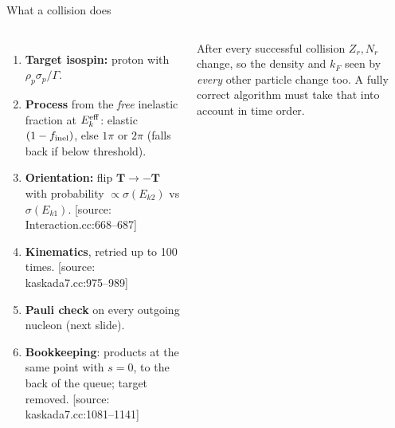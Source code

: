 \documentclass[10pt,aspectratio=169]{beamer}
\newcommand{\G}{\Gamma}
\newcommand{\Ekeff}{E_k^{\rm eff}}
\newcommand{\tagsrc}[1]{{\scriptsize\color{aBlue}[source: #1]}}
\begin{document}
\begin{frame}{What a collision does}
\small
\begin{columns}[T]
\begin{enumerate}
\item \textbf{Target isospin:} proton with $\rho_p\sigma_p/\G$.
\item \textbf{Process} from the \emph{free} inelastic fraction at $\Ekeff$: elastic $(1-f_{\rm inel})$, else $1\pi$ or $2\pi$ (falls back if below threshold).
\item \textbf{Orientation:} flip $\mathbf T\to-\mathbf T$ with probability $\propto\sigma(E_{k2})$ vs $\sigma(E_{k1})$. \tagsrc{Interaction.cc:668--687}
\item \textbf{Kinematics}, retried up to 100 times. \tagsrc{kaskada7.cc:975--989}
\item \textbf{Pauli check} on every outgoing nucleon (next slide).
\item \textbf{Bookkeeping}: products at the same point with $s=0$, to the back of the queue; target removed. \tagsrc{kaskada7.cc:1081--1141}
\end{enumerate}
\begin{keybox}
After every successful collision $Z_r,N_r$ change, so the density and $k_F$ seen by \emph{every} other particle change too. A fully correct algorithm must take that into account in time order.
\end{keybox}
\end{columns}
\end{frame}
\end{document}
